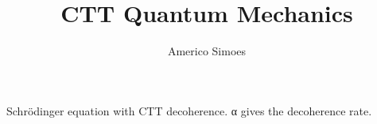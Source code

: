 \documentclass[12pt]{article}
\begin{document}
\title{CTT Quantum Mechanics}
\author{Americo Simoes}
\maketitle
Schrödinger equation with CTT decoherence. α gives the decoherence rate.
\end{document}

